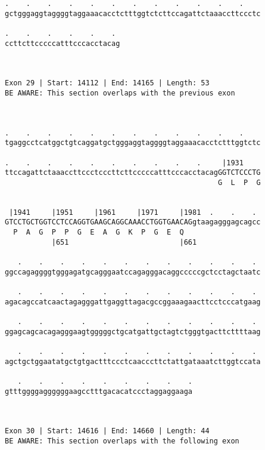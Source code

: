 \documentclass{article}
\begin{document}
\begin{Verbatim}
.    .    .    .    .    .    .    .    .    .    .    .    
gctgggaggtaggggtaggaaacacctctttggtctcttccagattctaaaccttccctc
                                                            
.    .    .    .    .    . 
ccttcttcccccatttcccacctacag
                           
                           
 
Exon 29 | Start: 14112 | End: 14165 | Length: 53
BE AWARE: This section overlaps with the previous exon



.    .    .    .    .    .    .    .    .    .    .    .    
tgaggcctcatggctgtcaggatgctgggaggtaggggtaggaaacacctctttggtctc
                                                            
.    .    .    .    .    .    .    .    .    .     |1931    
ttccagattctaaaccttccctcccttcttcccccatttcccacctacagGGTCTCCCTG
                                                  G  L  P  G
                                                            
  
 |1941     |1951     |1961     |1971     |1981  .    .    . 
GTCCTGCTGGTCCTCCAGGTGAAGCAGGCAAACCTGGTGAACAGgtaagagggagcagcc
  P  A  G  P  P  G  E  A  G  K  P  G  E  Q                  
           |651                          |661               
  
   .    .    .    .    .    .    .    .    .    .    .    . 
ggccagaggggtgggagatgcagggaatccagagggacaggcccccgctcctagctaatc
                                                            
   .    .    .    .    .    .    .    .    .    .    .    . 
agacagccatcaactagagggattgaggttagacgccggaaagaacttcctcccatgaag
                                                            
   .    .    .    .    .    .    .    .    .    .    .    . 
ggagcagcacagagggaagtgggggctgcatgattgctagtctgggtgacttcttttaag
                                                            
   .    .    .    .    .    .    .    .    .    .    .    . 
agctgctggaatatgctgtgactttccctcaacccttctattgataaatcttggtccata
                                                            
   .    .    .    .    .    .    .    .    .
gtttggggaggggggaagcctttgacacatccctaggaggaaga
                                            
                                            
 
Exon 30 | Start: 14616 | End: 14660 | Length: 44
BE AWARE: This section overlaps with the following exon




\end{Verbatim}
\end{document}

